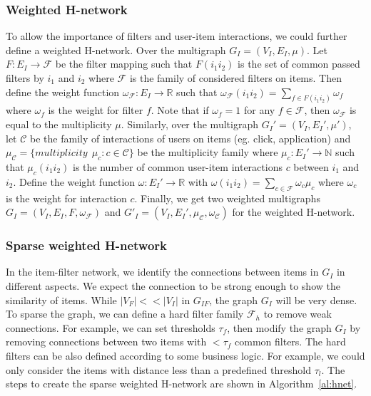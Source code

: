 \documentclass[manuscript,screen,review]{acmart}
\newcommand\Fcal{\mathcal{F}}
\begin{document}
\subsubsection{Weighted H-network} To allow the importance of filters and user-item interactions, we could further define a weighted H-network.
Over the multigraph $G_I=(V_I,E_I,\mu)$. Let $F:E_I\to \mathcal{F}$ be the filter mapping such that $F(i_1i_2)$ is the set of common passed filters by $i_1$ and $i_2$ where $\mathcal{F}$ is the family of considered filters on items.
Then define the weight function $\omega_\mathcal{F}: E_I\to\mathbb{R}$ such that $\omega_\mathcal{F}(i_1i_2)=\sum_{f\in F(i_1i_2)}\omega_f$ where $\omega_f$ is the weight for filter $f$. Note that if $\omega_f=1$ for any $f\in\mathcal{F}$, then $\omega_\mathcal{F}$ is equal to the multiplicity $\mu$. 
Similarly, over the multigraph $G_I'=(V_I,E_I',\mu')$, 
let $\mathcal{C}$ be the family of interactions of users on items (eg. click, application) and $\mu_{\mathcal{C}}=\{multiplicity\ \ \mu_c: c\in\mathcal{C}\}$ be the multiplicity family where $\mu_c: E_I'\to\mathbb{N}$ such that $\mu_c(i_1i_2)$ is the number of common user-item interactions $c$ between $i_1$ and $i_2$. Define the weight function $\omega: E_I'\to\mathbb{R}$ with $\omega(i_1i_2)=\sum_{c\in\mathcal{F}}\omega_c\mu_c$ where $\omega_c$ is the weight for interaction $c$. Finally, we get two weighted multigraphs $G_I=(V_I,E_I,F,\omega_{\mathcal{F}})$ and $G'_I=(V_I,E_I',\mu_{\mathcal{C}},\omega_{\mathcal{C}})$ for the weighted H-network.

\subsubsection{Sparse weighted H-network} In the item-filter network, we identify the connections between items in $G_I$ in different aspects. We expect the connection to be strong enough to show the similarity of items. While $|V_F|<<|V_I|$ in $G_{IF}$, the graph $G_{I}$ will be very dense. To sparse the graph, we can define a hard filter family $\Fcal_h$ to remove weak connections. For example, we can set thresholds $\tau_f$, then modify the graph $G_{I}$ by removing connections between two items with $<\tau_f$ common filters. The hard filters can be also defined according to some business logic. For example, we could only consider the items with distance less than a predefined threshold $\tau_l$. The steps to create the sparse weighted H-network are shown in Algorithm~\ref{al:hnet}. 
\end{document}
